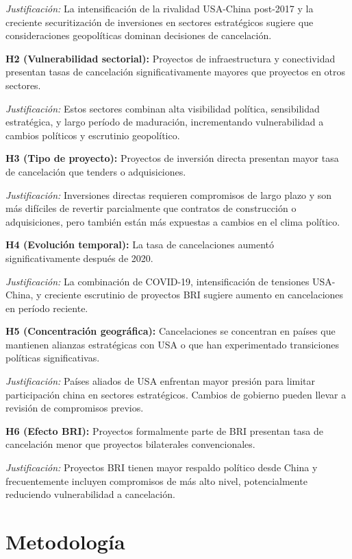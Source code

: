 \documentclass[12pt]{article}
\begin{document}
\textit{Justificación:} La intensificación de la rivalidad USA-China post-2017 y la creciente securitización de inversiones en sectores estratégicos sugiere que consideraciones geopolíticas dominan decisiones de cancelación.

\textbf{H2 (Vulnerabilidad sectorial):} Proyectos de infraestructura y conectividad presentan tasas de cancelación significativamente mayores que proyectos en otros sectores.

\textit{Justificación:} Estos sectores combinan alta visibilidad política, sensibilidad estratégica, y largo período de maduración, incrementando vulnerabilidad a cambios políticos y escrutinio geopolítico.

\textbf{H3 (Tipo de proyecto):} Proyectos de inversión directa presentan mayor tasa de cancelación que tenders o adquisiciones.

\textit{Justificación:} Inversiones directas requieren compromisos de largo plazo y son más difíciles de revertir parcialmente que contratos de construcción o adquisiciones, pero también están más expuestas a cambios en el clima político.

\textbf{H4 (Evolución temporal):} La tasa de cancelaciones aumentó significativamente después de 2020.

\textit{Justificación:} La combinación de COVID-19, intensificación de tensiones USA-China, y creciente escrutinio de proyectos BRI sugiere aumento en cancelaciones en período reciente.

\textbf{H5 (Concentración geográfica):} Cancelaciones se concentran en países que mantienen alianzas estratégicas con USA o que han experimentado transiciones políticas significativas.

\textit{Justificación:} Países aliados de USA enfrentan mayor presión para limitar participación china en sectores estratégicos. Cambios de gobierno pueden llevar a revisión de compromisos previos.

\textbf{H6 (Efecto BRI):} Proyectos formalmente parte de BRI presentan tasa de cancelación menor que proyectos bilaterales convencionales.

\textit{Justificación:} Proyectos BRI tienen mayor respaldo político desde China y frecuentemente incluyen compromisos de más alto nivel, potencialmente reduciendo vulnerabilidad a cancelación.

\section{Metodología}
\end{document}
